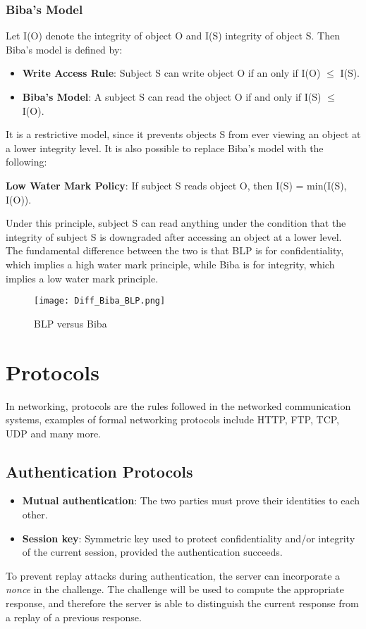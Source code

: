 \documentclass[a4paper]{article}
\begin{document}
\subsubsection{Biba's Model}
Let I(O) denote the integrity of object O and I(S) integrity of object S. Then Biba's model is defined by:
\begin{itemize}
    \item \textbf{Write Access Rule}: Subject S can write object O if an only if I(O) $\leq$ I(S).
    \item \textbf{Biba's Model}: A subject S can read the object O if and only if I(S) $\leq$ I(O).
\end{itemize}
It is a restrictive model, since it prevents objects S from ever viewing an object at a lower integrity level. It is also possible to replace Biba's model with the following:
\begin{center}
    \textbf{Low Water Mark Policy}: If subject S reads object O, then I(S) = min(I(S), I(O)).
\end{center}
Under this principle, subject S can read anything under the condition that the integrity of subject S is downgraded after accessing an object at a lower level.\\
The fundamental difference between the two is that BLP is for confidentiality, which implies a high water mark principle, while Biba is for integrity, which implies a low water mark principle.
\begin{figure}[H]
    \centering
    \texttt{[image: Diff\_Biba\_BLP.png]}
    \caption{BLP versus Biba}
\end{figure}

\newpage
\section{Protocols}
In networking, protocols are the rules followed in the networked communication systems, examples of formal networking protocols include HTTP, FTP, TCP, UDP and many more.

\subsection{Authentication Protocols}
\begin{itemize}
    \item \textbf{Mutual authentication}: The two parties must prove their identities to each other.
    \item \textbf{Session key}: Symmetric key used to protect confidentiality and/or integrity of the current session, provided the authentication succeeds.
\end{itemize}
To prevent replay attacks during authentication, the server can incorporate a \textit{nonce} in the challenge. The challenge will be used to compute the appropriate response, and therefore the server is able to distinguish the current response from a replay of a previous response.
\end{document}

